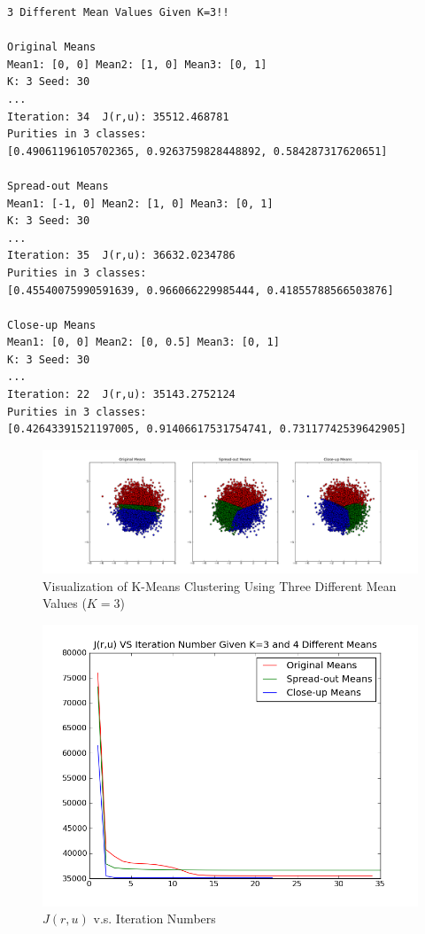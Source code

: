 \begin{itemize}
\begin{verbatim}
3 Different Mean Values Given K=3!!

Original Means
Mean1: [0, 0] Mean2: [1, 0] Mean3: [0, 1]
K: 3 Seed: 30
...
Iteration: 34  J(r,u): 35512.468781
Purities in 3 classes: 
[0.49061196105702365, 0.9263759828448892, 0.584287317620651]

Spread-out Means
Mean1: [-1, 0] Mean2: [1, 0] Mean3: [0, 1]
K: 3 Seed: 30
...
Iteration: 35  J(r,u): 36632.0234786
Purities in 3 classes: 
[0.45540075990591639, 0.966066229985444, 0.41855788566503876]

Close-up Means
Mean1: [0, 0] Mean2: [0, 0.5] Mean3: [0, 1]
K: 3 Seed: 30
...
Iteration: 22  J(r,u): 35143.2752124
Purities in 3 classes: 
[0.42643391521197005, 0.91406617531754741, 0.73117742539642905]
\end{verbatim}

\begin{figure}[htb]
\centering
\includegraphics[width=18cm]{F6.png}
\caption{Visualization of K-Means Clustering Using Three Different Mean Values ($K=3$)}
\label{F6}
\end{figure}

\begin{figure}[htb]
\centering
\includegraphics[width=15cm]{F7.png}
\caption{$J(r,u)$ v.s. Iteration Numbers}
\label{F7}
\end{figure}



\end{itemize}
